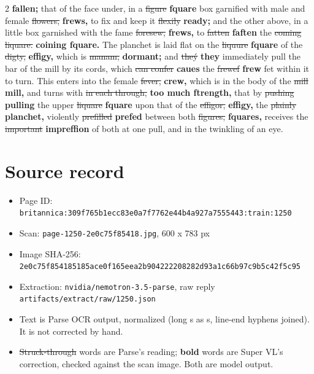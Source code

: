 \documentclass[10pt]{article}
\begin{document}
\begin{multicols}{2}
\textbf{fallen;} that of the face under, in a \sout{figure} \textbf{fquare} box garnified with male and female \sout{flowers,} \textbf{frews,} to fix and keep it \sout{flexily} \textbf{ready;} and the other above, in a little box garnished with the fame \sout{foresew,} \textbf{frews,} to \sout{fatten} \textbf{faften} the \sout{coming liquare.} \textbf{coining fquare.} The planchet is laid flat on the \sout{liquure} \textbf{fquare} of the \sout{digty,} \textbf{effigy,} which is \sout{manam;} \textbf{dormant;} and \sout{theý} \textbf{they} immediately pull the bar of the mill by its cords, which \sout{can confer} \textbf{caues} the \sout{frewef} \textbf{frew} fet within it to turn. This enters into the female \sout{fever,} \textbf{crew,} which is in the body of the \sout{mill} \textbf{mill,} and turns with \sout{in each through,} \textbf{too much ftrength,} that by \sout{pushing} \textbf{pulling} the upper \sout{liquare} \textbf{fquare} upon that of the \sout{effigor,} \textbf{effigy,} the \sout{plainly} \textbf{planchet,} violently \sout{prefilled} \textbf{prefed} between both \sout{figures,} \textbf{fquares,} receives the \sout{important} \textbf{impreffion} of both at one pull, and in the twinkling of an eye.
\end{multicols}
\section*{Source record}
\begin{itemize}
\item Page ID: \texttt{britannica:309f765b1ecc83e0a7f7762e44b4a927a7555443:train:1250}
\item Scan: \texttt{page-1250-2e0c75f85418.jpg}, 600 x 783 px
\item Image SHA-256: \texttt{\small 2e0c75f854185185ace0f165eea2b904222208282d93a1c66b97c9b5c42f5c95}
\item Extraction: \texttt{nvidia/nemotron-3.5-parse}, raw reply \texttt{artifacts/extract/raw/1250.json}
\item Text is Parse OCR output, normalized (long s as s, line-end hyphens joined). It is not corrected by hand.
\item \sout{Struck-through} words are Parse's reading; \textbf{bold} words are Super VL's correction, checked against the scan image. Both are model output.
\end{itemize}
\end{document}
